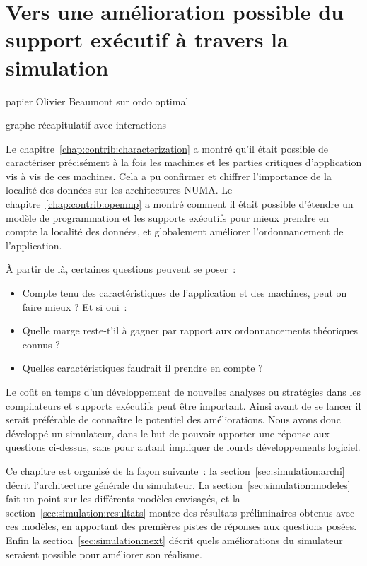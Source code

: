 \chapter{Vers une amélioration possible du support exécutif à travers la simulation}\label{chap:simulation}
\chaptertoc

\begin{todo}
  papier Olivier Beaumont sur ordo optimal
\end{todo}
\begin{todo}
  graphe récapitulatif avec interactions
\end{todo}

Le chapitre~\ref{chap:contrib:characterization} a montré qu'il était possible de caractériser précisément à la fois les machines et les parties critiques d'application vis à vis de ces machines.
Cela a pu confirmer et chiffrer l'importance de la localité des données sur les architectures NUMA.
Le chapitre~\ref{chap:contrib:openmp} a montré comment il était possible d'étendre un modèle de programmation et les supports exécutifs pour mieux prendre en compte la localité des données, et globalement améliorer l'ordonnancement de l'application.

À partir de là, certaines questions peuvent se poser~:
\begin{itemize}
  \item Compte tenu des caractéristiques de l'application et des machines, peut on faire mieux ? Et si oui~:
  \item Quelle marge reste-t'il à gagner par rapport aux ordonnancements théoriques connus ?
  \item Quelles caractéristiques faudrait il prendre en compte ?
\end{itemize}

Le coût en temps d'un développement de nouvelles analyses ou stratégies dans les compilateurs et supports exécutifs peut être important. Ainsi avant de se lancer il serait préférable de connaître le potentiel des améliorations.
Nous avons donc développé un simulateur, dans le but de pouvoir apporter une réponse aux questions ci-dessus, sans pour autant impliquer de lourds développements logiciel.

Ce chapitre est organisé de la façon suivante~: la section~\ref{sec:simulation:archi} décrit l'architecture générale du simulateur.
La section~\ref{sec:simulation:modeles} fait un point sur les différents modèles envisagés, et la section~\ref{sec:simulation:resultats} montre des résultats préliminaires obtenus avec ces modèles, en apportant des premières pistes de réponses aux questions posées.
Enfin la section~\ref{sec:simulation:next} décrit quels améliorations du simulateur seraient possible pour améliorer son réalisme.

